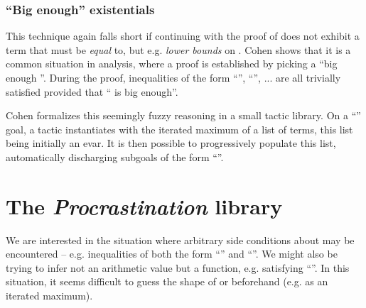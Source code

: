 \documentclass[xetex,format=acmlarge,screen=true,authorversion=true]{acmart-modified}
\begin{document}

\subsubsection*{``Big enough'' existentials}

This technique again falls short if continuing with the proof of  does
not exhibit a term that  must be \emph{equal} to, but e.g. \emph{lower
  bounds} on . Cohen \cite[\S5.1.4]{cohen-12} shows that it is a common
situation in analysis, where a proof is established by picking a ``big enough
''. During the proof, inequalities of the form ``'', ``'', ... are all trivially satisfied provided that `` is big enough''.


Cohen formalizes this seemingly fuzzy reasoning in a small tactic library. On a
``'' goal, a tactic instantiates  with the iterated maximum of
a list of terms, this list being initially an evar. It is then possible to
progressively populate this list, automatically discharging subgoals of the
form ``''.
%


\section{The \emph{Procrastination} library}

We are interested in the situation where arbitrary side conditions about 
may be encountered -- e.g. inequalities of both the form ``'' and
``''. We might also be trying to infer not an arithmetic value but a
function, e.g.  satisfying ``''. In this
situation, it seems difficult to guess the shape of  or  beforehand
(e.g. as an iterated maximum).
%
%
\end{document}
